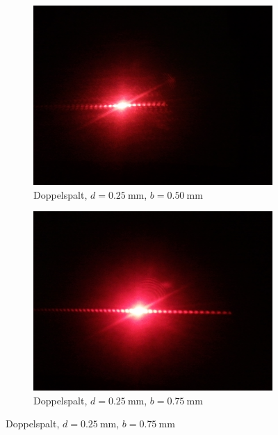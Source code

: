 \documentclass[ngerman, parskip*]{scrartcl}
\begin{document}
\begin{figure}
\centering
        \begin{subfigure}[!h]{0.49\textwidth}
          \centering
          \includegraphics[width=\textwidth,natwidth=2560,natheight=1920]{Bilder/Doppelspalt_1.jpg}
          \caption{Doppelspalt, $d = \SI{0,25}{\mm}$, $b = \SI{0,50}{\mm}$}
        \end{subfigure}
        \begin{subfigure}[!h]{0.49\textwidth}
          \centering
          \includegraphics[width=\textwidth,natwidth=2560,natheight=1920]{Bilder/Doppelspalt_2.jpg}
          \caption{Doppelspalt, $d = \SI{0,25}{\mm}$, $b = \SI{0,75}{\mm}$}
        \end{subfigure}
\end{figure}
\end{document}
